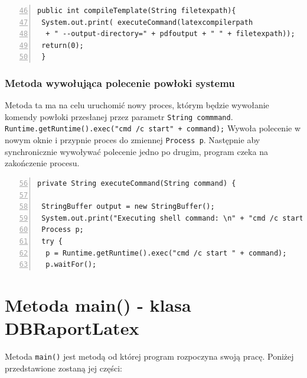  \begin{lstlisting}[numbers=left,firstnumber=46]
public int compileTemplate(String filetexpath){
 System.out.print( executeCommand(latexcompilerpath
  + " --output-directory=" + pdfoutput + " " + filetexpath));
 return(0);
 }
\end{lstlisting}

\subsubsection*{Metoda wywołująca polecenie powłoki systemu}


Metoda ta ma na celu uruchomić nowy proces, którym będzie wywołanie komendy powłoki przesłanej przez parametr \texttt{String commmand}. \texttt{Runtime.getRuntime().exec("cmd /c start" + command);} Wywoła polecenie w nowym oknie i przypnie proces do zmiennej \texttt{Process p}. Następnie aby synchronicznie wywoływać polecenie jedno po drugim, program czeka na zakończenie procesu. 

 \begin{lstlisting}[numbers=left,firstnumber=56]
private String executeCommand(String command) {
 
 StringBuffer output = new StringBuffer();
 System.out.print("Executing shell command: \n" + "cmd /c start " + command);
 Process p;
 try {
  p = Runtime.getRuntime().exec("cmd /c start " + command);
  p.waitFor();

\end{lstlisting}

\section{Metoda main() - klasa DBRaportLatex }

Metoda \texttt{main()} jest metodą od której program rozpoczyna swoją pracę. Poniżej przedstawione zostaną jej części:

